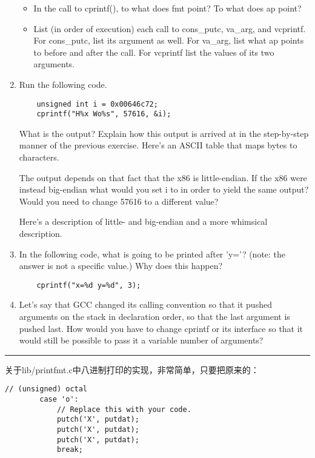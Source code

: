\documentclass{article}
\newcommand{\funcname}[1]{{\ttfamily \small #1}}
\begin{document}
\begin{CJK*}{UTF8}{gkai}
\begin{enumerate}
{\begin{itemize}
\item{In the call to \funcname{cprintf()}, to what does \funcname{fmt} point? To what does \funcname{ap} point?}
\item{List (in order of execution) each call to \funcname{cons\_putc, va\_arg}, and \funcname{vcprintf}. For \funcname{cons\_putc}, list its argument as well. For \funcname{va\_arg}, list what ap points to before and after the call. For \funcname{vcprintf} list the values of its two arguments.}
\end{itemize}
}
\item{Run the following code.

{\scriptsize
\begin{verbatim}
    unsigned int i = 0x00646c72;
    cprintf("H%x Wo%s", 57616, &i);
\end{verbatim}}
What is the output? Explain how this output is arrived at in the step-by-step manner of the previous exercise. Here's an ASCII table that maps bytes to characters.

The output depends on that fact that the x86 is little-endian. If the x86 were instead big-endian what would you set i to in order to yield the same output? Would you need to change 57616 to a different value?

Here's a description of little- and big-endian and a more whimsical description.
}
\item{
In the following code, what is going to be printed after '\funcname{y=}'? (note: the answer is not a specific value.) Why does this happen?
{\scriptsize
\begin{verbatim}
    cprintf("x=%d y=%d", 3);
\end{verbatim}}
}
\item{Let's say that GCC changed its calling convention so that it pushed arguments on the stack in declaration order, so that the last argument is pushed last. How would you have to change \funcname{cprintf} or its interface so that it would still be possible to pass it a variable number of arguments?}
\end{enumerate}

\hrule
\vspace{2em}

关于lib/printfmt.c中八进制打印的实现，非常简单，只要把原来的：

\begin{lstlisting}[style=ccode, firstnumber=207, title={\scriptsize \ttfamily \bfseries lib/printfmt.c}]
        // (unsigned) octal
        case 'o':
            // Replace this with your code.
            putch('X', putdat);
            putch('X', putdat);
            putch('X', putdat);
            break;
\end{lstlisting}


\end{CJK*}
\end{document}
